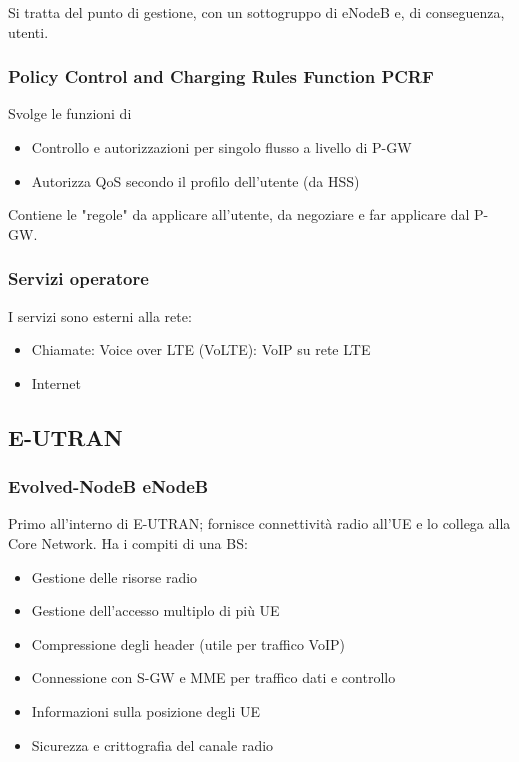 Si tratta del punto di gestione, con un sottogruppo di eNodeB e, di conseguenza, utenti.

\subsubsection{Policy Control and Charging Rules Function PCRF} 

Svolge le funzioni di 
\begin{itemize}
	\item Controllo e autorizzazioni per singolo flusso a livello di P-GW

	\item Autorizza QoS secondo il profilo dell'utente (da HSS)
\end{itemize}

Contiene le "regole" da applicare all'utente, da negoziare e far applicare dal P-GW.

\subsubsection{Servizi operatore} 

I servizi sono esterni alla rete: 
\begin{itemize}
	\item Chiamate: Voice over LTE (VoLTE): VoIP su rete LTE

	\item Internet
\end{itemize}

\subsection{E-UTRAN}

\subsubsection{Evolved-NodeB eNodeB} 

Primo all'interno di E-UTRAN; fornisce connettività radio all'UE e lo collega alla Core Network. Ha i compiti di una BS:
\begin{itemize}
	\item Gestione delle risorse radio

	\item Gestione dell'accesso multiplo di più UE

	\item Compressione degli header (utile per traffico VoIP)

	\item Connessione con S-GW e MME per traffico dati e controllo

	\item Informazioni sulla posizione degli UE

	\item Sicurezza e crittografia del canale radio
\end{itemize}

